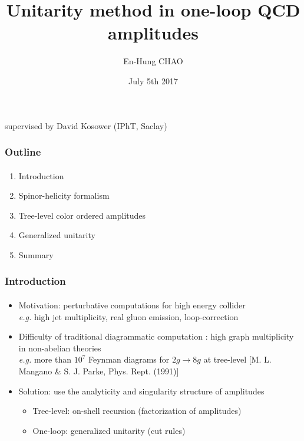 \documentclass[english]{beamer}
\title{Unitarity method in one-loop QCD amplitudes}
\author{En-Hung CHAO}
\institute{{\'E}cole Normale Sup{\'e}rieure}
\date{July 5th 2017}
\newcommand{\eg}{\textit{e.g. }}
\begin{document}

\begin{frame}
\titlepage%
\centerline{supervised by David Kosower (IPhT, Saclay)}
\end{frame}
\begin{frame}
\frametitle{Outline}
\framesubtitle{}

\begin{enumerate}

\item Introduction
\item Spinor-helicity formalism
\item Tree-level color ordered amplitudes
\item Generalized unitarity
\item Summary

\end{enumerate}

\end{frame}
\begin{frame}
\frametitle{Introduction}
\framesubtitle{}

\begin{itemize}
\item<1-> Motivation: perturbative computations for high energy collider \\ \eg high jet multiplicity, real gluon emission, loop-correction
\item<2-> Difficulty of traditional diagrammatic computation :
     high graph multiplicity in non-abelian theories \\
     \eg more than $10^7$ Feynman diagrams for $2g\rightarrow 8g$ at tree-level 
     \tiny\color{blue}[M. L. Mangano \& S. J. Parke, Phys.
Rept. (1991)]\color{black}\normalsize
\item<3-> Solution: use the analyticity and singularity structure of amplitudes
    \begin{itemize}
    \item<4-> Tree-level: on-shell recursion (factorization of amplitudes)
    \item<5-> One-loop: generalized unitarity (cut rules)
    \end{itemize}
\end{itemize}
\end{frame}
\end{document}
